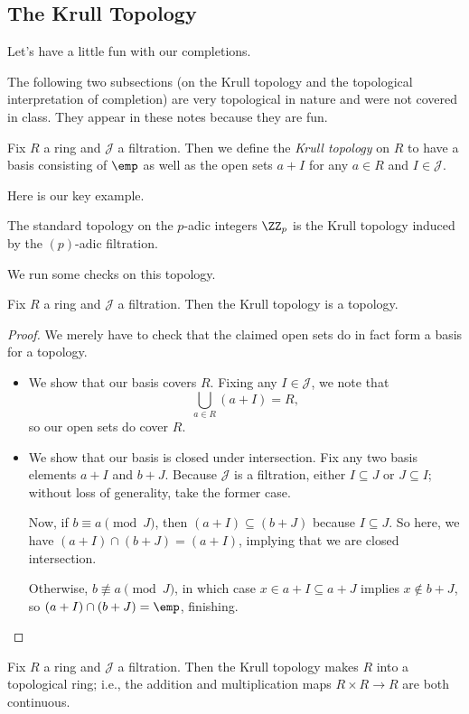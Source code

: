 \subsection{The Krull Topology}
Let's have a little fun with our completions.
\begin{warn}
	The following two subsections (on the Krull topology and the topological interpretation of completion) are very topological in nature and were not covered in class. They appear in these notes because they are fun.
\end{warn}
\begin{defi}
	Fix $R$ a ring and $\mathcal J$ a filtration. Then we define the \textit{Krull topology} on $R$ to have a basis consisting of $\emp$ as well as the open sets $a+I$ for any $a\in R$ and $I\in\mathcal J$.
\end{defi}
Here is our key example.
\begin{example}
	The standard topology on the $p$-adic integers $\ZZ_p$ is the Krull topology induced by the $(p)$-adic filtration.
\end{example}
We run some checks on this topology.
\begin{lemma}
	Fix $R$ a ring and $\mathcal J$ a filtration. Then the Krull topology is a topology.
\end{lemma}
\begin{proof}
	We merely have to check that the claimed open sets do in fact form a basis for a topology.
	\begin{itemize}
		\item We show that our basis covers $R$. Fixing any $I\in\mathcal J$, we note that
		\[\bigcup_{a\in R}(a+I)=R,\]
		so our open sets do cover $R$.
		\item We show that our basis is closed under intersection. Fix any two basis elements $a+I$ and $b+J$. Because $\mathcal J$ is a filtration, either $I\subseteq J$ or $J\subseteq I$; without loss of generality, take the former case.

		Now, if $b\equiv a\pmod J$, then $(a+I)\subseteq(b+J)$ because $I\subseteq J$. So here, we have $(a+I)\cap(b+J)=(a+I)$, implying that we are closed intersection.

		Otherwise, $b\not\equiv a\pmod J$, in which case $x\in a+I\subseteq a+J$ implies $x\notin b+J$, so $(a+I)\cap(b+J)=\emp$, finishing.
		\qedhere
	\end{itemize}
\end{proof}
\begin{lemma} \label{lem:krulltoporing}
	Fix $R$ a ring and $\mathcal J$ a filtration. Then the Krull topology makes $R$ into a topological ring; i.e., the addition and multiplication maps $R\times R\to R$ are both continuous.
\end{lemma}
